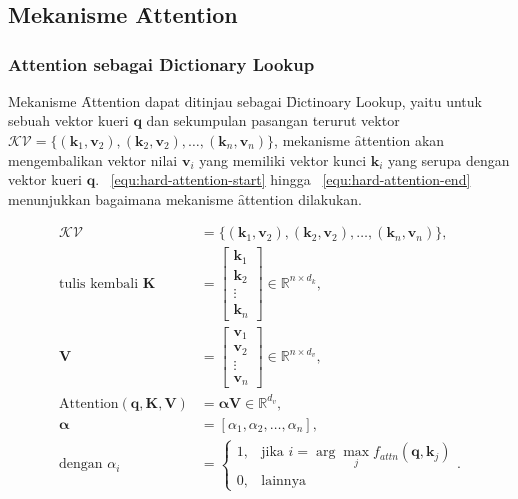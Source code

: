 \chapter{\babTiga}
\label{bab:3}

\noindent{}

\section{Mekanisme \f{Attention}}
	\subsection{Attention sebagai \f{Dictionary Lookup}}

	Mekanisme \f{Attention} dapat ditinjau sebagai \f{Dictinoary Lookup}, yaitu untuk sebuah vektor kueri $\mathbf{q}$ dan sekumpulan pasangan terurut vektor $\mathcal{KV} = \{(\mathbf{k}_1, \mathbf{v}_2), (\mathbf{k}_2, \mathbf{v}_2), \dots, (\mathbf{k}_n, \mathbf{v}_n)\}$, mekanisme \f{attention} akan mengembalikan vektor nilai $\mathbf{v}_i$ yang memiliki vektor kunci $\mathbf{k}_i$ yang serupa dengan vektor kueri $\mathbf{q}$. \equ~\ref{equ:hard-attention-start} hingga \equ~\ref{equ:hard-attention-end} menunjukkan bagaimana mekanisme \f{attention} dilakukan.

\begin{align}
	\label{equ:hard-attention-start}
	\mathcal{KV} &= \{(\mathbf{k}_1, \mathbf{v}_2), (\mathbf{k}_2, \mathbf{v}_2), \dots, (\mathbf{k}_n, \mathbf{v}_n)\}, \\
	\text{tulis kembali }\mathbf{K}&= \begin{bmatrix}
		\mathbf{k}_1 \\
		\mathbf{k}_2 \\
		\vdots \\
		\mathbf{k}_n
	\end{bmatrix} \in \mathbb{R}^{n \times d_k}, \\
	\mathbf{V} &= \begin{bmatrix}
		\mathbf{v}_1 \\
		\mathbf{v}_2 \\
		\vdots \\
		\mathbf{v}_n
	\end{bmatrix} \in \mathbb{R}^{n \times d_v}, \\
	\text{Attention}(\mathbf{q}, \mathbf{K}, \mathbf{V}) &= \bm{\alpha}\mathbf{V} \in \mathbb{R}^{d_v},\\
	\bm{\alpha} &= [\alpha_{1}, \alpha_{2}, \dots, \alpha_{n}], \\
	\label{equ:hard-attention-end}
	\text{dengan } \alpha_i &= 
	\begin{cases}
	1, & \text{jika } i = \arg\max_{j} f_{attn}(\mathbf{q}, \mathbf{k}_j) \\
	0, & \text{lainnya}
	\end{cases}.
	\end{align}

